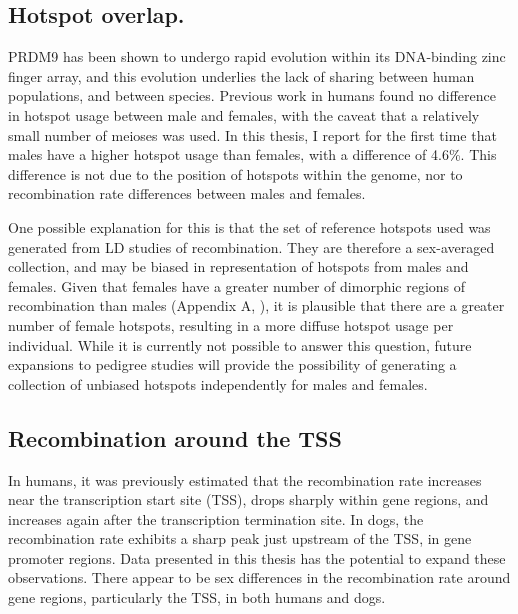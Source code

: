 \subsection{Hotspot overlap.}

PRDM9 has been shown to undergo rapid evolution within its DNA-binding zinc finger array\cite{Oliver2009,Ponting2011}, and this evolution underlies the lack of sharing between human populations\cite{Hinch2011}, and between species\cite{Auton2012a}.
Previous work in humans found no difference in hotspot usage between male and females\cite{Coop2008}, with the caveat that a relatively small number of meioses was used.
In this thesis, I report for the first time that males have a higher hotspot usage than females, with a difference of 4.6\%.
This difference is not due to the position of hotspots within the genome, nor to recombination rate differences between males and females.

One possible explanation for this is that the set of reference hotspots used was generated from LD studies of recombination\cite{Myers2005,hapmap2007}.
They are therefore a sex-averaged collection, and may be biased in representation of hotspots from males and females.
Given that females have a greater number of dimorphic regions of recombination than males (Appendix A, \citet{Bherer2016}), it is plausible that there are a greater number of female hotspots, resulting in a more diffuse hotspot usage per individual.
While it is currently not possible to answer this question, future expansions to pedigree studies will provide the possibility of generating a collection of unbiased hotspots independently for males and females.


\subsection{Recombination around the TSS}

In humans, it was previously estimated that the recombination rate increases near the transcription start site (TSS), drops sharply within gene regions, and increases again after the transcription termination site\cite{Mcvean2004,Myers2005,hapmap2007,Spencer2006,Kong2010}.
In dogs, the recombination rate exhibits a sharp peak just upstream of the TSS, in gene promoter regions\cite{Auton2013}.
Data presented in this thesis has the potential to expand these observations.
There appear to be sex differences in the recombination rate around gene regions, particularly the TSS, in both humans and dogs.

